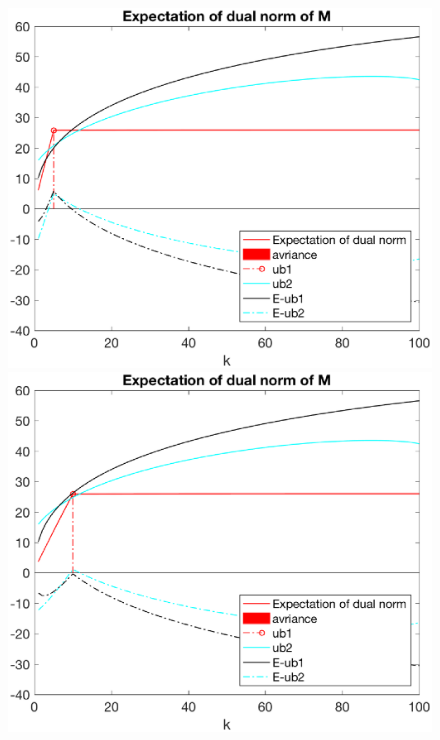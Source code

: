 \documentclass[12pt]{article}
\begin{document}
\begin{figure}[h]
    \begin{minipage}[c]{.4\linewidth}
        \centering
        \includegraphics[width=\linewidth]{Fig/dualnorm-u0ones-k0-5-minusnoise.eps}
    \end{minipage}
    \hfill%
    \begin{minipage}[c]{.4\linewidth}
        \centering
        \includegraphics[width=\linewidth]{Fig/dualnorm-u0ones-k0-10-minusnoise.eps}
    \end{minipage}
\end{figure}
\end{document}
